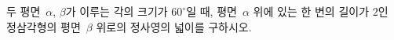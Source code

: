두 평면~$\alpha$, $\beta$가 이루는 각의 크기가 $60^\circ$일 때, 평면~$\alpha$ 위에 있는 한 변의 길이가 $2$인 정삼각형의 평면~$\beta$ 위로의 정사영의 넓이를 구하시오.
